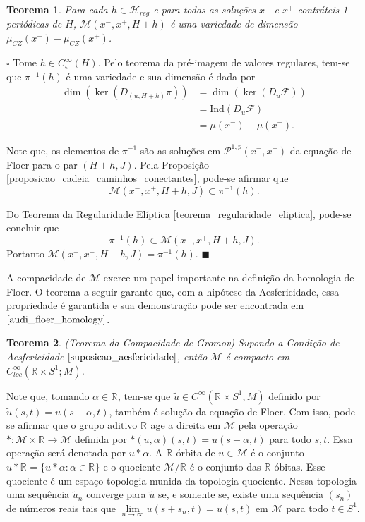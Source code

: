 \documentclass[12pt]{book}
\newtheorem{teorema}{Teorema}[section]
\newenvironment{prova}[1]{$\square$ #1}{\hfill$\blacksquare$}
\newcommand{\aplicaoessuaves}[2]{C^{\infty}(#1, #2)}
\newcommand{\caminhosexponenciaisconectantes}[2]{\mathcal{P}^{1,p}(#1, #2)}
\newcommand{\caminhosexponenciaisconectantespadrao}{\caminhosexponenciaisconectantes{x^{-}}{x^{+}}}
\newcommand{\circulo}{S^{1}}
\newcommand{\diferencialfloerponto}[1]{D_{#1}\operadorFloer}
\newcommand{\energiafinitaM}{\mathcal{M}}
\newcommand{\energiafinitaMconectanteHamiltoniana}{\energiafinitaM(x^{-}, x^{+},H+h,J)}
\newcommand{\hamiltonianasRegulares}{\mathcal{H}_{reg}}
\newcommand{\iconley}[1]{\iconleyabrev(#1)}
\newcommand{\iconleyabrev}{\mu_{CZ}}
\newcommand{\ind}{\text{Ind}}
\newcommand{\operadorFloer}{\mathcal{F}}
\newcommand{\perturbacaoHamiltoniana}[1]{C^{\infty}_{\epsilon}(#1)}
\newcommand{\retacartesianocirculo}{\real{} \times \circulo}
\newcommand{\real}[1]{\mathbb{R}^{#1}}
\newcommand{\reta}{\real{}}
\begin{document}
	\begin{teorema}\label{teorema_variedade_espaco_trajetoria}
		Para cada $h \in \hamiltonianasRegulares$ e para todas as soluções $x^{-}$ e $x^{+}$ contráteis 1-periódicas de $H$, $\energiafinitaM(x^{-}, x^{+}, H+h)$ é uma variedade de dimensão $\iconley{x^{-}}-\iconley{x^{+}}$.
	\end{teorema}
	\begin{prova} Tome $h \in \perturbacaoHamiltoniana{H}$. Pelo teorema da pré-imagem de valores regulares, tem-se que $\pi^{-1}(h)$ é uma variedade e sua dimensão é dada por
			$$
			\begin{aligned}
			\dim(\ker(D_{(u, H+h)}\pi)) &= \dim(\ker(\diferencialfloerponto{u}))
			\\
			&=\ind{(\diferencialfloerponto{u})}
			\\
			&=\mu(x^{-})-\mu(x^{+}).
			\end{aligned}
			$$
			
			Note que, os elementos de $\pi^{-1}$ são as soluções em $\caminhosexponenciaisconectantespadrao$ da equação de Floer para o par $(H+h, J)$. Pela Proposição \ref{proposicao_cadeia_caminhos_conectantes}, pode-se afirmar que 
			$$
			\energiafinitaMconectanteHamiltoniana \subset\pi^{-1}(h).
			$$
			
			Do Teorema da Regularidade Elíptica \ref{teorema_regularidade_eliptica}, pode-se concluir que 
			$$
			\pi^{-1}(h) \subset\energiafinitaMconectanteHamiltoniana.
			$$
			Portanto $\energiafinitaMconectanteHamiltoniana =\pi^{-1}(h)$.
	\end{prova}
	
	A compacidade de $\energiafinitaM$ exerce um papel importante na definição da homologia de Floer. O teorema a seguir garante que, com a hipótese da Aesfericidade, essa propriedade é garantida e sua demonstração pode ser encontrada em $\cite{audi_floer_homology}$.
	
	\begin{teorema}\label{teorema_compacidade_gromov}
		(Teorema da Compacidade de Gromov) Supondo a Condição de Aesfericidade $\ref{suposicao_aesfericidade}$, então $\energiafinitaM$ é compacto em $C^{\infty}_{loc}(\retacartesianocirculo; M)$.
	\end{teorema}
	
	
	Note que, tomando $\alpha\in \reta$, tem-se que $\tilde{u}\in \aplicaoessuaves{\retacartesianocirculo}{M}$ definido por $ \tilde{u}(s,t)=u(s+\alpha,t)$, também é solução da equação de Floer. Com isso, pode-se afirmar que o grupo aditivo $\reta$ age a direita em $\energiafinitaM$ pela operação $*:\energiafinitaM\times \reta\to \energiafinitaM$ definida por $*(u,\alpha)(s,t) = u(s+\alpha,t)$ para todo $s,t$. Essa operação será denotada por $u*\alpha$. A $\reta$-órbita de $u \in \energiafinitaM$ é o conjunto $u*\reta = \{u*\alpha  : \alpha\in \reta\}$ e o quociente $\energiafinitaM/\reta$ é o conjunto das $\reta$-óbitas. Esse quociente é um espaço topologia munida da topologia quociente. Nessa topologia uma sequência $\tilde{u}_{n}$ converge para $\tilde{u}$ se, e somente se, existe uma sequência $(s_{n})$ de números reais tais que $\lim\limits_{n\to \infty}u(s+s_{n}, t) = u(s,t)$ em $\energiafinitaM$ para todo $t \in \circulo$.
	
\end{document}
